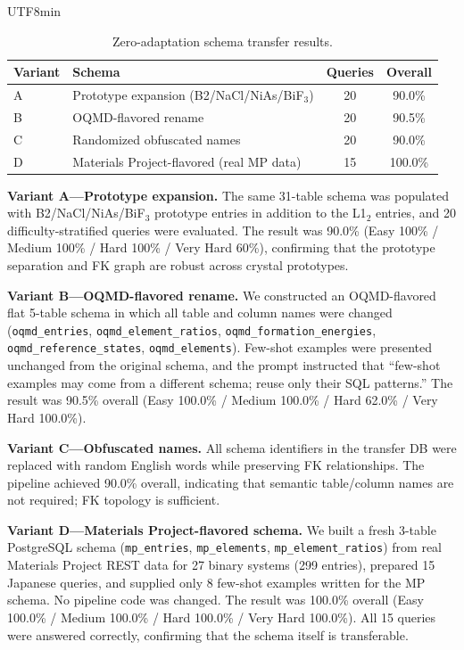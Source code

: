 \documentclass[sn-mathphys,Numbered]{sn-jnl}
\begin{document}
\begin{CJK}{UTF8}{min}
\begin{table}[t]
\centering
\caption{Zero-adaptation schema transfer results.}
\label{tab:transfer_eval}
\begin{tabular}{@{}llcc@{}}
\toprule
Variant & Schema & Queries & Overall \\ \midrule
A & Prototype expansion (B2/NaCl/NiAs/BiF$_3$) & 20 & 90.0\% \\
B & OQMD-flavored rename & 20 & 90.5\% \\
C & Randomized obfuscated names & 20 & 90.0\% \\
D & Materials Project-flavored (real MP data) & 15 & 100.0\% \\
\bottomrule
\end{tabular}
\end{table}

\textbf{Variant A---Prototype expansion.}
The same 31-table schema was populated with B2/NaCl/NiAs/BiF$_3$
prototype entries in addition to the L1$_2$ entries, and 20
difficulty-stratified queries were evaluated. The result was 90.0\%
(Easy 100\% / Medium 100\% / Hard 100\% / Very Hard 60\%),
confirming that the prototype separation and FK graph are robust
across crystal prototypes.

\textbf{Variant B---OQMD-flavored rename.}
We constructed an OQMD-flavored flat 5-table schema in which all
table and column names were changed
(\texttt{oqmd\_entries}, \texttt{oqmd\_element\_ratios},
\texttt{oqmd\_formation\_energies}, \texttt{oqmd\_reference\_states},
\texttt{oqmd\_elements}).
Few-shot examples were presented unchanged from the original schema,
and the prompt instructed that ``few-shot examples may come from a
different schema; reuse only their SQL patterns.''
The result was 90.5\% overall
(Easy 100.0\% / Medium 100.0\% / Hard 62.0\% / Very Hard 100.0\%).

\textbf{Variant C---Obfuscated names.}
All schema identifiers in the transfer DB were replaced with random
English words while preserving FK relationships. The pipeline
achieved 90.0\% overall, indicating that semantic table/column
names are not required; FK topology is sufficient.

\textbf{Variant D---Materials Project-flavored schema.}
We built a fresh 3-table PostgreSQL schema
(\texttt{mp\_entries}, \texttt{mp\_elements}, \texttt{mp\_element\_ratios})
from real Materials Project REST data for 27 binary systems (299
entries), prepared 15 Japanese queries, and supplied only 8
few-shot examples written for the MP schema. No pipeline code was
changed. The result was 100.0\% overall
(Easy 100.0\% / Medium 100.0\% / Hard 100.0\% / Very Hard 100.0\%).
All 15 queries were answered correctly, confirming that the schema itself is transferable.


\end{CJK}
\end{document}
